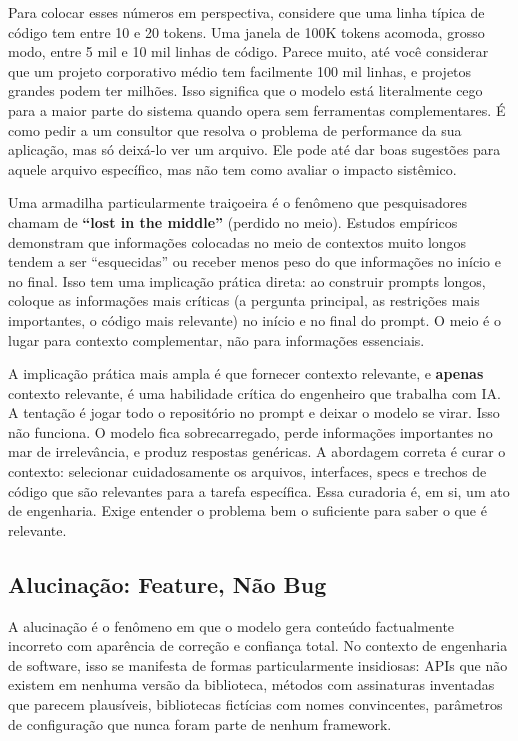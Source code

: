 Para colocar esses números em perspectiva, considere que uma linha típica de código
tem entre 10 e 20 tokens. Uma janela de 100K tokens acomoda, grosso modo, entre 5
mil e 10 mil linhas de código. Parece muito, até você considerar que um projeto
corporativo médio tem facilmente 100 mil linhas, e projetos grandes podem ter
milhões. Isso significa que o modelo está literalmente cego para a maior parte do
sistema quando opera sem ferramentas complementares. É como pedir a um consultor
que resolva o problema de performance da sua aplicação, mas só deixá-lo ver um
arquivo. Ele pode até dar boas sugestões para aquele arquivo específico, mas
não tem como avaliar o impacto sistêmico.

Uma armadilha particularmente traiçoeira é o fenômeno que pesquisadores chamam de
\textbf{``lost in the middle''} (perdido no meio). Estudos empíricos demonstram que
informações colocadas no meio de contextos muito longos tendem a ser ``esquecidas''
ou receber menos peso do que informações no início e no final. Isso tem uma
implicação prática direta: ao construir prompts longos, coloque as informações mais
críticas (a pergunta principal, as restrições mais importantes, o código mais
relevante) no início e no final do prompt. O meio é o lugar para contexto
complementar, não para informações essenciais.

A implicação prática mais ampla é que fornecer contexto relevante, e \textbf{apenas}
contexto relevante, é uma habilidade crítica do engenheiro que trabalha com IA.
A tentação é jogar todo o repositório no prompt e deixar o modelo se virar. Isso não
funciona. O modelo fica sobrecarregado, perde informações importantes no mar de
irrelevância, e produz respostas genéricas. A abordagem correta é curar o contexto:
selecionar cuidadosamente os arquivos, interfaces, specs e trechos de código que são
relevantes para a tarefa específica. Essa curadoria é, em si, um ato de engenharia.
Exige entender o problema bem o suficiente para saber o que é relevante.

\subsection{Alucinação: Feature, Não Bug}

A alucinação é o fenômeno em que o modelo gera conteúdo factualmente incorreto com
aparência de correção e confiança total. No contexto de engenharia de software, isso
se manifesta de formas particularmente insidiosas: APIs que não existem em nenhuma
versão da biblioteca, métodos com assinaturas inventadas que parecem plausíveis,
bibliotecas fictícias com nomes convincentes, parâmetros de configuração que nunca
foram parte de nenhum framework.

